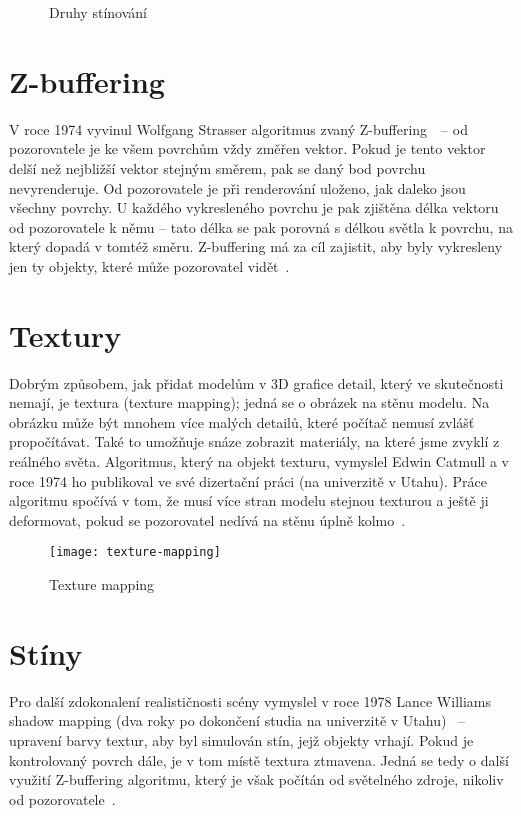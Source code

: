 \documentclass[a4paper, 11pt]{report}
\begin{document}
\begin{chapterwithoutpagebreak}
\begin{figure}[h]
    \centering
    \qquad
    \caption[Druhy stínování]{Druhy stínování~\cite{pic:gouraudphong}}
\end{figure}

\section{\label{z-buffering}Z-buffering}
V roce 1974 vyvinul Wolfgang Strasser algoritmus zvaný \mbox{Z-buffering~\cite{ieee:strasser}}~-- od pozorovatele je ke všem povrchům vždy změřen vektor. Pokud je tento vektor delší než nejbližší vektor stejným směrem, pak se daný bod povrchu nevyrenderuje. Od pozorovatele je při renderování uloženo, jak daleko jsou všechny povrchy. U každého vykresleného povrchu je pak zjištěna délka vektoru od pozorovatele k němu -- tato délka se pak porovná s délkou světla k povrchu, na který dopadá v tomtéž směru. Z-buffering má za cíl zajistit, aby byly vykresleny jen ty objekty, které může pozorovatel vidět~\cite{comphope:z-buffering}.

\section{Textury}
Dobrým způsobem, jak přidat modelům v 3D grafice detail, který ve skutečnosti nemají, je textura (texture mapping); jedná se o obrázek  na stěnu modelu. Na obrázku může být mnohem více malých detailů, které počítač nemusí zvlášť propočítávat. Také to umožňuje snáze zobrazit materiály, na které jsme zvyklí z reálného světa. Algoritmus, který na objekt  texturu, vymyslel Edwin Catmull a v roce 1974 ho publikoval ve své dizertační práci (na univerzitě v Utahu). Práce algoritmu spočívá v tom, že musí více stran modelu  stejnou texturou a ještě ji deformovat, pokud se pozorovatel nedívá na stěnu úplně kolmo~\cite{utexas:texture-mapping}.

\begin{figure}[h]
    \centering
    \texttt{[image: texture-mapping]}
    \caption[Texture mapping]{Texture mapping~\cite{utexas:texture-mapping}}
\end{figure}

\section{Stíny}
Pro další zdokonalení realističnosti scény vymyslel v roce 1978 Lance Williams shadow mapping (dva roky po dokončení studia na univerzitě v Utahu)~\cite{nvidia:shadow-mapping} -- upravení barvy textur, aby byl simulován stín, jejž objekty vrhají. Pokud je kontrolovaný povrch dále, je v tom místě textura ztmavena. Jedná se tedy o další využití Z-buffering algoritmu, který je však počítán od světelného zdroje, nikoliv od pozorovatele~\cite{wiki:shadow-mapping}.


\end{chapterwithoutpagebreak}
\end{document}
